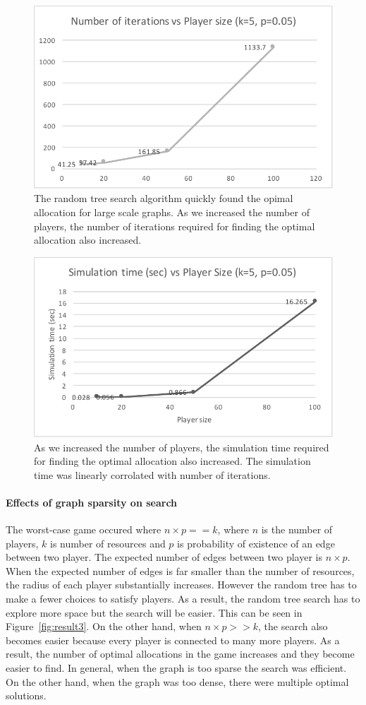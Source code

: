 \begin{figure}[htb]
\begin{center}
\includegraphics[width=.4\textwidth]{result-1}
\end{center}
\caption{The random tree search algorithm quickly found the opimal allocation for large scale graphs. As we increased the number of players, the number of iterations required for finding the optimal allocation also increased.}
\label{fig:result1}
\end{figure}

\begin{figure}[htb]
\begin{center}
\includegraphics[width=.4\textwidth]{result-2}
\end{center}
\caption{As we increased the number of players, the simulation time required for finding the optimal allocation also increased. The simulation time was linearly corrolated with number of iterations.}
\label{fig:result2}
\end{figure}



\paragraph{Effects of graph sparsity on search}
The worst-case game occured where $n\times p == k$, where $n$ is the number of players, $k$ is number of resources and $p$ is probability of existence of an edge between two player. The expected number of edges between two player is $n\times p$. When the expected number of edges is far smaller than the number of resources, the radius of each player substantially increases. However the random tree has to make a fewer choices to satisfy players. As a result, the random tree search has to explore more space but the search will be easier. This can be seen in Figure~\ref{fig:result3}. On the other hand, when $n\times p >> k$, the search also becomes easier because every player is connected to many more players. As a result, the number of optimal allocations in the game increases and they become easier to find. In general, when the graph is too sparse the search was efficient. On the other hand, when the graph was too dense, there were multiple optimal solutions.


